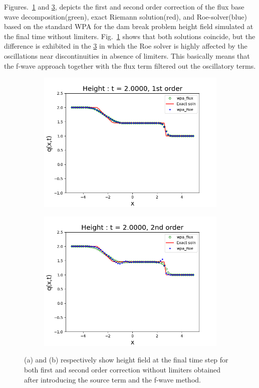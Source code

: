 \documentclass[12pt,a4paper]{article}
\begin{document}
	Figures.~\ref{fig:f1} and \ref{fig:f2}, depicts the first and second order correction of the flux base wave decomposition(green), exact Riemann solution(red), and Roe-solver(blue) based on the standard WPA for the dam break problem height field simulated at the final time without limiters. Fig.~\ref{fig:f1}  shows that both solutions coincide, but the difference is exhibited in the \ref{fig:f2} in which the Roe solver is highly affected by the oscillations near discontinuities in absence of limiters. This basically means that the f-wave approach together with the flux term filtered out the oscillatory terms.
	
	\begin{figure}[H]
		\begin{subfigure}[b]{0.5\textwidth}
			\centering
			\includegraphics[width=1.0\linewidth]{images/f1}
			\caption{}
			\label{fig:f1}
		\end{subfigure}
		\begin{subfigure}[b]{0.5\textwidth}
			\centering
			\includegraphics[width=1.0\linewidth]{images/f2}
			\caption{}
			\label{fig:f2}
		\end{subfigure}
		\caption{(a) and (b) respectively show height field at the final time step for both first and second order correction without limiters obtained after introducing the source term and the f-wave method. }
	\end{figure}
	
\end{document}
